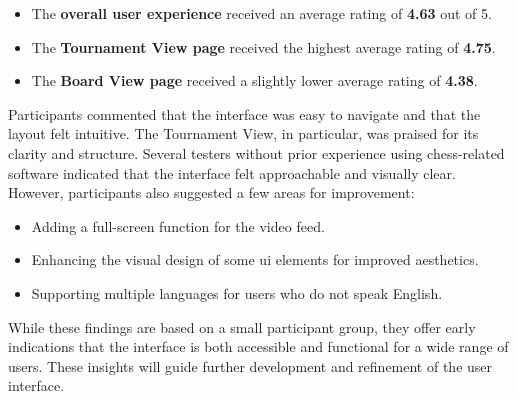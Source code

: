 \begin{itemize}
    \item The \textbf{overall user experience} received an average rating of \textbf{4.63} out of 5.
    \item The \textbf{Tournament View page} received the highest average rating of \textbf{4.75}.
    \item The \textbf{Board View page} received a slightly lower average rating of \textbf{4.38}.
\end{itemize}

Participants commented that the interface was easy to navigate and that the layout felt intuitive. The Tournament View, in particular, was praised for its clarity and structure. Several testers without prior experience using chess-related software indicated that the interface felt approachable and visually clear. \\

However, participants also suggested a few areas for improvement:

\begin{itemize}
    \item Adding a full-screen function for the video feed.
    \item Enhancing the visual design of some \gls{ui} elements for improved aesthetics.
    \item Supporting multiple languages for users who do not speak English.
\end{itemize}

While these findings are based on a small participant group, they offer early indications that the interface is both accessible and functional for a wide range of users. These insights will guide further development and refinement of the user interface.

